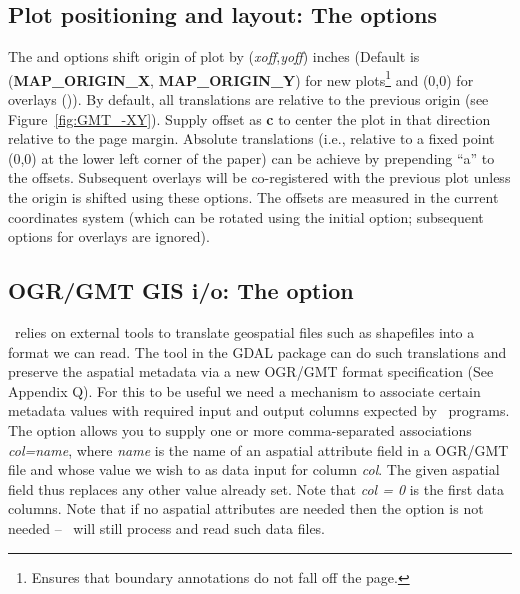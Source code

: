 \subsection{Plot positioning and layout: The   options}

The  and  options shift origin of plot by (\emph{xoff},\emph{yoff})
inches (Default is (\textbf{MAP\_ORIGIN\_X}, \textbf{MAP\_ORIGIN\_Y}) for new plots\footnote{Ensures that
boundary annotations do not fall off the page.} and (0,0) for overlays ()).
By default, all translations are relative to the previous origin
(see Figure~\ref{fig:GMT_-XY}).  Supply offset as \textbf{c} to center the
plot in that direction relative to the page margin.
Absolute translations (i.e., relative to a fixed point (0,0) at the
lower left corner of the paper) can be achieve by prepending ``a''
to the offsets.  Subsequent overlays will be co-registered with the
previous plot unless the origin is shifted using these options.
The offsets are measured in the current coordinates system (which can
be rotated using the initial  option; subsequent  options
for overlays are ignored).

\subsection{OGR/GMT GIS i/o: The  option}

\GMT\ relies on external tools to translate geospatial files such as shapefiles
into a format we can read.  The tool  in the GDAL package can do such
translations and preserve the aspatial metadata via a new OGR/GMT format
specification (See Appendix Q).  For this to be useful we need a mechanism
to associate certain metadata values with required input and output columns expected
by \GMT\ programs.  The  option allows you to supply one or more
comma-separated associations \emph{col=name}, where
\emph{name} is the name of an aspatial attribute field in a OGR/GMT file
and whose value we wish to as data input for column \emph{col}.  The
given aspatial field thus replaces any other value already set.  Note
that \emph{col = 0} is the first data columns.  Note that if no aspatial attributes
are needed then the  option is not needed -- \GMT\ will still process
and read such data files.

